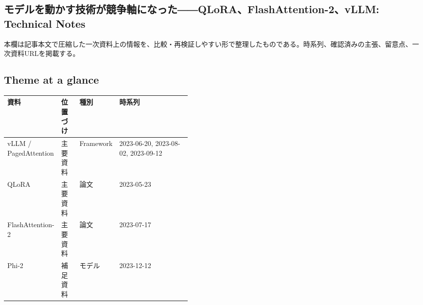 \subsection*{モデルを動かす技術が競争軸になった――QLoRA、FlashAttention-2、vLLM: Technical Notes}
本欄は記事本文で圧縮した一次資料上の情報を、比較・再検証しやすい形で整理したものである。時系列、確認済みの主張、留意点、一次資料URLを掲載する。
\smallskip
{}\par
\medskip
\subsection*{Theme at a glance}
\begin{center}
\footnotesize
\begin{tabularx}{\linewidth}{@{}p{0.20\linewidth}p{0.10\linewidth}p{0.14\linewidth}X@{}}
\toprule
資料 & 位置づけ & 種別 & 時系列 \\
\midrule
vLLM / PagedAttention & 主要資料 & Framework & 2023-06-20, 2023-08-02, 2023-09-12 \\
QLoRA & 主要資料 & 論文 & 2023-05-23 \\
FlashAttention-2 & 主要資料 & 論文 & 2023-07-17 \\
Phi-2 & 補足資料 & モデル & 2023-12-12 \\
\bottomrule
\end{tabularx}
\end{center}
\normalsize

